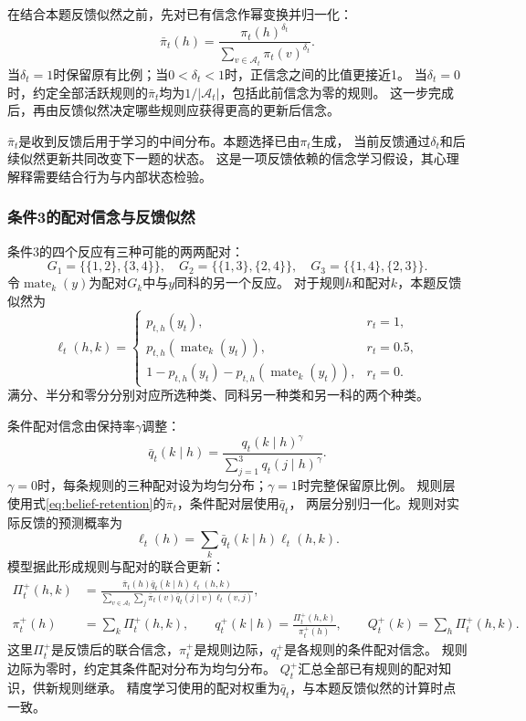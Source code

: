 \documentclass[11pt,a4paper]{article}
\numberwithin{equation}{section}
\newcommand{\A}{\mathcal{A}}
\begin{document}
在结合本题反馈似然之前，先对已有信念作幂变换并归一化：
\begin{equation}
\bar\pi_t(h)=\frac{\pi_t(h)^{\delta_t}}
{\sum_{v\in\A_t}\pi_t(v)^{\delta_t}}.
\label{eq:belief-retention}
\end{equation}
当$\delta_t=1$时保留原有比例；当$0<\delta_t<1$时，正信念之间的比值更接近1。
当$\delta_t=0$时，约定全部活跃规则的$\bar\pi_t$均为$1/|\A_t|$，包括此前信念为零的规则。
这一步完成后，再由反馈似然决定哪些规则应获得更高的更新后信念。

$\bar\pi_t$是收到反馈后用于学习的中间分布。本题选择已由$\pi_t$生成，
当前反馈通过$\delta_t$和后续似然更新共同改变下一题的状态。
这是一项反馈依赖的信念学习假设，其心理解释需要结合行为与内部状态检验。

\subsubsection{条件3的配对信念与反馈似然}
\label{sec:pairing}
条件3的四个反应有三种可能的两两配对：
\begin{equation}
G_1=\{\{1,2\},\{3,4\}\},\quad G_2=\{\{1,3\},\{2,4\}\},\quad
G_3=\{\{1,4\},\{2,3\}\}.
\end{equation}
令$\operatorname{mate}_k(y)$为配对$G_k$中与$y$同科的另一个反应。
对于规则$h$和配对$k$，本题反馈似然为
\begin{equation}
\ell_t(h,k)=\begin{cases}
p_{t,h}(y_t),&r_t=1,\\
p_{t,h}(\operatorname{mate}_k(y_t)),&r_t=0.5,\\
1-p_{t,h}(y_t)-p_{t,h}(\operatorname{mate}_k(y_t)),&r_t=0.
\end{cases}
\label{eq:pair-likelihood}
\end{equation}
满分、半分和零分分别对应所选种类、同科另一种类和另一科的两个种类。


条件配对信念由保持率$\gamma$调整：
\begin{equation}
\bar q_t(k\mid h)=\frac{q_t(k\mid h)^\gamma}
{\sum_{j=1}^3q_t(j\mid h)^\gamma}.
\label{eq:pair-forgetting}
\end{equation}
$\gamma=0$时，每条规则的三种配对设为均匀分布；$\gamma=1$时完整保留原比例。
规则层使用式\eqref{eq:belief-retention}的$\bar\pi_t$，条件配对层使用$\bar q_t$，
两层分别归一化。规则对实际反馈的预测概率为
\begin{equation}
\ell_t(h)=\sum_k\bar q_t(k\mid h)\ell_t(h,k).
\label{eq:marginal-likelihood}
\end{equation}
模型据此形成规则与配对的联合更新：
\begin{align}
\Pi_t^+(h,k)&=
\frac{\bar\pi_t(h)\bar q_t(k\mid h)\ell_t(h,k)}
{\sum_{v\in\A_t}\sum_j\bar\pi_t(v)\bar q_t(j\mid v)\ell_t(v,j)},\\
\pi_t^+(h)&=\sum_k\Pi_t^+(h,k),\qquad
q_t^+(k\mid h)=\frac{\Pi_t^+(h,k)}{\pi_t^+(h)},\qquad
Q_t^+(k)=\sum_h\Pi_t^+(h,k).
\label{eq:pair-update}
\end{align}
这里$\Pi_t^+$是反馈后的联合信念，$\pi_t^+$是规则边际，$q_t^+$是各规则的条件配对信念。
规则边际为零时，约定其条件配对分布为均匀分布。
$Q_t^+$汇总全部已有规则的配对知识，供新规则继承。
精度学习使用的配对权重为$\bar q_t$，与本题反馈似然的计算时点一致。
\end{document}
